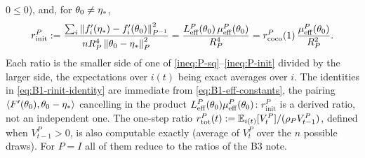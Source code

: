 \begin{definition}
$0\le0$), and, for $\theta_0\neq\eta_\ast$,
\begin{equation}\label{eq:B1-rinit-identity}
r^P_{\mathrm{init}}:=\frac{\sum_i\left\|f'_i(\eta_\ast)-f'_i(\theta_0)\right\|_{P^{-1}}^2}
{nR_P^4\left\|\theta_0-\eta_\ast\right\|_P^2}
=\frac{L_{\mathrm{eff}}^P(\theta_0)\,\mu_{\mathrm{eff}}^P(\theta_0)}{R_P^4}
=r^P_{\mathrm{coco}}(1)\,\frac{\mu_{\mathrm{eff}}^P(\theta_0)}{R_P^2} .
\end{equation}
Each ratio is the smaller side of one of \eqref{ineq:P-sq}--\eqref{ineq:P-init} divided by the larger side,
the expectations over $i(t)$ being exact averages over $i$. The identities in \eqref{eq:B1-rinit-identity}
are immediate from \eqref{eq:B1-eff-constants}, the pairing $\left\langle F'(\theta_0), \theta_0-\eta_\ast \right\rangle$
cancelling in the product $L_{\mathrm{eff}}^P(\theta_0)\mu_{\mathrm{eff}}^P(\theta_0)$: $r^P_{\mathrm{init}}$ is a derived ratio,
not an independent one. The one-step ratio $r^P_{\mathrm{tot}}(t):=\mathbb{E}_{i(t)}[V_t^P]/(\rho_PV_{t-1}^P)$, defined
when $V_{t-1}^P>0$, is also computable exactly (average of $V_t^P$ over the $n$ possible draws). For $P=I$
all of them reduce to the ratios of the B3 note.
\end{definition}


